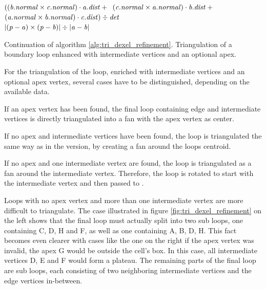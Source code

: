 \begin{algorithm}
\begin{algorithmic}[1]
				\State \Return $((\mathit{b}.\mathit{normal} \times \mathit{c}.\mathit{normal}) \cdot \mathit{a}.\mathit{dist} + {}$\hfill\break
				\hspace*{\dimexpr\algorithmicindent*2}\phantom{\Return $($}$(\mathit{c}.\mathit{normal} \times \mathit{a}.\mathit{normal}) \cdot \mathit{b}.\mathit{dist} + {}$\hfill\break
				\hspace*{\dimexpr\algorithmicindent*2}\phantom{\Return $($}$(\mathit{a}.\mathit{normal} \times \mathit{b}.\mathit{normal}) \cdot \mathit{c}.\mathit{dist}) \div \mathit{det}$
			\EndIf
		\EndFunction
		\\
			\State \Return $|(\mathit{p} - \mathit{a}) \times (\mathit{p} - \mathit{b})| \div |\mathit{a} - \mathit{b}|$
		\EndFunction
	\end{algorithmic}
	\caption{
		Continuation of algorithm \ref{alg:tri_dexel_refinement}.
		Triangulation of a boundary loop enhanced with intermediate vertices and an optional apex.
	}
	\label{alg:tri_dexel_refinement_triangulation}
\end{algorithm}
%
For the triangulation of the loop, enriched with intermediate vertices and an optional apex vertex, several cases have to be distinguished, depending on the available data.

If an apex vertex has been found, the final loop containing edge and intermediate vertices is directly triangulated into a fan with the apex vertex as center.

If no apex and intermediate vertices have been found, the loop is triangulated the same way as in the  version, by creating a fan around the loops centroid.

If no apex and one intermediate vertex are found, the loop is triangulated as a fan around the intermediate vertex.
Therefore, the loop is rotated to start with the intermediate vertex and then passed to .

Loops with no apex vertex and more than one intermediate vertex are more difficult to triangulate.
The case illustrated in figure \ref{fig:tri_dexel_refinement} on the left shows that the final loop must actually split into two sub loops, one containing C, D, H and F, as well as one containing A, B, D, H.
This fact becomes even clearer with cases like the one on the right if the apex vertex was invalid, \eg the apex G would be outside the cell's box.
In this case, all intermediate vertices D, E and F would form a plateau.
The remaining parts of the final loop are sub loops, each consisting of two neighboring intermediate vertices and the edge vertices in-between.

